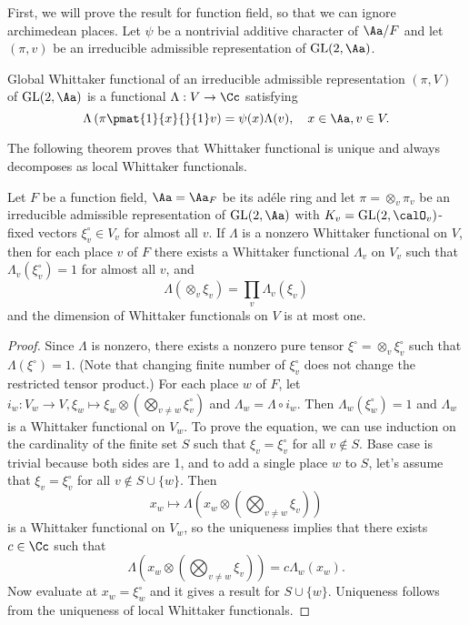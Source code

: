 First, we will prove the result for function field, so that we can ignore archimedean places. 
Let $\psi$ be a nontrivial additive character of $\Aa/F$ and let $(\pi, v)$ be an irreducible admissible representation of $\GL(2, \Aa)$. 
\begin{definition}
Global Whittaker functional of an irreducible admissible representation $(\pi, V)$ of $\GL(2, \Aa)$ is a functional $\Lambda : V\to \Cc$ satisfying 
$$
\Lambda \left( \pi \pmat{1}{x}{}{1}v \right) = \psi(x) \Lambda(v), \quad x\in \Aa, v\in V.
$$
\end{definition}
The following theorem proves that Whittaker functional is unique and always decomposes as local Whittaker functionals. 
\begin{theorem}
\label{ffwituniq}
Let $F$ be a function field, $\Aa = \Aa_{F}$ be its ad\'ele ring and let $\pi = \otimes_{v} \pi_{v}$ be an irreducible admissible representation of $\GL(2, \Aa)$ with $K_{v} = \GL(2, \calO_{v})$-fixed vectors $\xi_{v}^{\circ}\in V_{v}$ for almost all $v$. 
If $\Lambda$ is a nonzero Whittaker functional on $V$, then for each place $v$ of $F$ there exists a Whittaker functional $\Lambda_{v}$ on $V_{v}$ such that $\Lambda_{v}(\xi_{v}^{\circ}) = 1$ for almost all $v$, and 
$$
\Lambda ( \otimes_{v}\xi_{v}) = \prod_{v} \Lambda_{v}(\xi_{v})
$$
and the dimension of Whittaker functionals on $V$ is at most one. 
\end{theorem}
\begin{proof}
Since $\Lambda$ is nonzero, there exists a nonzero pure tensor $\xi^{\circ} = \otimes_{v} \xi_{v}^{\circ}$ such that $\Lambda(\xi^{\circ})= 1$. (Note that changing finite number of $\xi_{v}^{\circ}$ does not change the restricted tensor product.) 
For each place $w$ of $F$, let $i_{w} : V_{w} \to V, \xi_{w} \mapsto \xi_{w} \otimes (\bigotimes_{v\neq w} \xi_{v}^{\circ})$ and $\Lambda_{w} = \Lambda \circ i_{w}$. 
Then $\Lambda_{w}(\xi_{w}^{\circ}) =1$ and $\Lambda_{w}$ is a Whittaker functional on $V_{w}$. 
To prove the equation, we can use induction on the cardinality of the finite set $S$ such that $\xi_{v} =\xi_{v}^{\circ}$ for all $v\not\in S$. 
Base case is trivial because both sides are 1, and to add a single place $w$ to $S$, let's assume that $\xi_{v} = \xi_{v}^{\circ}$ for all $v\not\in S\cup \{w\}$. 
Then 
$$
x_{w} \mapsto \Lambda \left( x_{w} \otimes \left( \bigotimes_{v\neq w} \xi_{v}\right)\right)
$$
is a Whittaker functional on $V_{w}$, so the uniqueness implies that there exists $c\in \Cc$ such that 
$$
\Lambda \left( x_{w} \otimes \left( \bigotimes_{v\neq w} \xi_{v}\right)\right) = c\Lambda_{w} (x_{w}).
$$
Now evaluate at $x_{w} = \xi_{w}^{\circ}$ and it gives a result for $S \cup \{w\}$. 
Uniqueness follows from the uniqueness of local Whittaker functionals. 
\end{proof}

